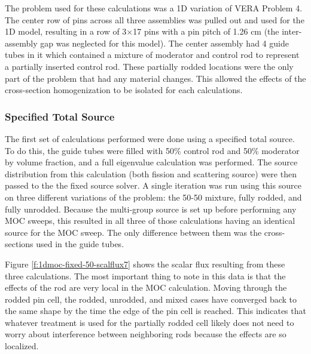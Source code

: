 The problem used for these calculations was a 1D variation of VERA Problem 4.  The center row of pins across all three assemblies was pulled out and used for the 1D model, resulting in a row of 3$\times$17 pins with a pin pitch of 1.26 cm (the inter-assembly gap was neglected for this model).  The center assembly had 4 guide tubes in it which contained a mixture of moderator and control rod to represent a partially inserted control rod.  These partially rodded locations were the only part of the problem that had any material changes.  This allowed the effects of the cross-section homogenization to be isolated for each calculations.

\subsubsection{Specified Total Source}

The first set of calculations performed were done using a specified total source.  To do this, the guide tubes were filled with 50\% control rod and 50\% moderator by volume fraction, and a full eigenvalue calculation was performed.  The source distribution from this calculation (both fission and scattering source) were then passed to the the fixed source solver.  A single iteration was run using this source on three different variations of the problem: the 50-50 mixture, fully rodded, and fully unrodded.  Because the multi-group source is set up before performing any MOC sweeps, this resulted in all three of those calculations having an identical source for the MOC sweep.  The only difference between them was the cross-sections used in the guide tubes.

Figure \ref{f:1dmoc-fixed-50-scalflux7} shows the scalar flux resulting from these three calculations.  The most important thing to note in this data is that the effects of the rod are very local in the MOC calculation.  Moving through the rodded pin cell, the rodded, unrodded, and mixed cases have converged back to the same shape by the time the edge of the pin cell is reached.  This indicates that whatever treatment is used for the partially rodded cell likely does not need to worry about interference between neighboring rods because the effects are so localized.

